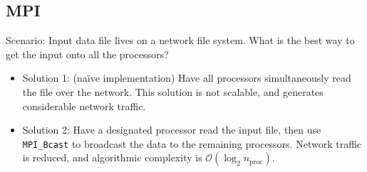 \documentclass[compress,12pt]{beamer}
\begin{document}
 
\subsection{MPI}
\begin{frame}%
  Scenario: Input data file lives on a network file system.  What
  is the best way to get the input onto all the processors?
  \begin{itemize} 
    \item Solution 1: (na\"{i}ve implementation) Have all processors simultaneously
      read the file over the network.  This solution is not scalable, and generates
      considerable network traffic.
    \item Solution 2: Have a designated processor read the input file, then use \texttt{MPI\_Bcast}
      to broadcast the data to the remaining processors. Network traffic is reduced, and
      algorithmic complexity is $\mathcal{O}(\log_2 n_\text{proc})$.
  \end{itemize}
\end{frame}
\end{document}
